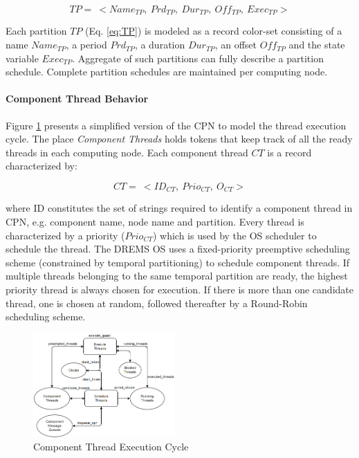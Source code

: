 \vspace{-0.15in}
\begin{equation}
\label{eq:TP}
TP = \ < Name_{TP}, \ Prd_{TP}, \ Dur_{TP}, \ Off_{TP}, \ Exec_{TP} >
\end{equation}

Each partition $TP$ (Eq. \ref{eq:TP}) is modeled as a record color-set consisting of a name $Name_{TP}$, a period $Prd_{TP}$, a duration $Dur_{TP}$, an offset $Off_{TP}$ and the state variable  $Exec_{TP}$. Aggregate of such partitions can fully describe a partition schedule. Complete partition schedules are maintained per computing node.

\paragraph{Component Thread Behavior}

Figure \ref{fig:Thread_Execution} presents a simplified version of the CPN to model the thread execution cycle. The place \emph{Component Threads} holds tokens that keep track of all the ready threads in each computing node. Each component thread $CT$ is a record characterized by:

\vspace{-0.1in}
\begin{equation}
\label{eq:CT}
CT = \ <ID_{CT}, \ Prio_{CT}, \ O_{CT}>
\end{equation}

where ID constitutes the set of strings required to identify a component thread in CPN, e.g. component name, node name and partition. Every thread is characterized by a priority ($Prio_{CT}$) which is used by the OS scheduler to schedule the thread. The DREMS OS uses a fixed-priority preemptive scheduling scheme (constrained by temporal partitioning) to schedule component threads. If multiple threads belonging to the same temporal partition are ready, the highest priority thread is always chosen for execution. If there is more than one candidate thread, one is chosen at random, followed thereafter by a Round-Robin scheduling scheme. 

\begin{figure}[htb]
	\centering
	\includegraphics[width=0.48\textwidth]{figs/Thread_Execution.png}
	\caption{Component Thread Execution Cycle}
	\label{fig:Thread_Execution}
\end{figure}

